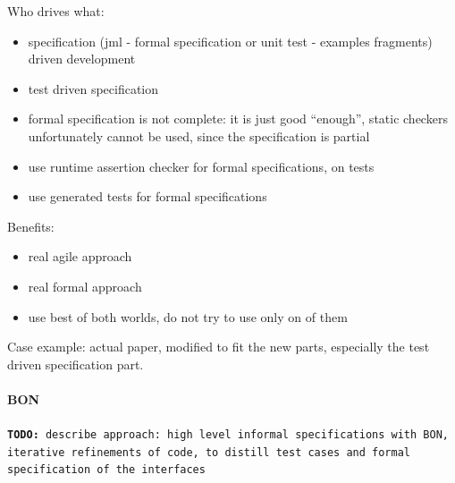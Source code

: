 \documentclass{article} \usepackage{times}
\newcommand{\todo}[1]{\texttt{\textbf{TODO:} #1}}
\begin{document}
Who drives what:
\begin{itemize}
\item specification (jml - formal specification or unit test -
  examples fragments) driven development
\item test driven specification
\item formal specification is not complete: it is just good
  ``enough'', static checkers unfortunately cannot be used, since the
  specification is partial
\item use runtime assertion checker for formal specifications, on
  tests
\item use generated tests for formal specifications
\end{itemize}

Benefits:
\begin{itemize}
\item real agile approach
\item real formal approach
\item use best of both worlds, do not try to use only on of them
\end{itemize}

Case example: actual paper, modified to fit the new parts, especially
the test driven specification part.

\paragraph*{BON}

\todo{describe approach: high level informal specifications with BON,
  iterative refinements of code, to distill test cases and formal
  specification of the interfaces}




 

\end{document}
